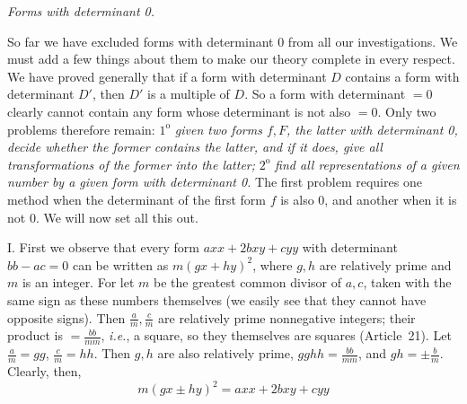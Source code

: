 \begin{center}
\textit{Forms with determinant 0.}
\end{center}

So far we have excluded forms with determinant 0 from all our investigations. We must add a few things about them to make our theory complete in every respect. We have proved generally that if a form with determinant $D$ contains a form with determinant $D'$, then $D'$ is a multiple of $D$. So a form with determinant $=0$ clearly cannot contain any form whose determinant is not also $=0$. Only two problems therefore remain: $1^{\mathrm{o}}$ \textit{given two forms $f,F$, the latter with determinant 0, decide whether the former contains the latter, and if it does, give all transformations of the former into the latter;} $2^{\mathrm{o}}$ \textit{find all representations of a given number by a given form with determinant 0.} The first problem requires one
method when the determinant of the first form $f$ is also 0, and another when it is not 0. We will now set all this out.

I. First we observe that every form $axx+2bxy+cyy$ with determinant $bb-ac=0$ can be written as $m(gx+hy)^2$, where $g,h$ are relatively prime and $m$ is an integer. For let $m$ be the greatest common divisor of $a,c$, taken with the same sign as these numbers themselves (we easily see that they cannot have opposite signs). Then $\frac{a}{m},\frac{c}{m}$ are relatively prime nonnegative integers; their product is $=\frac{bb}{mm}$, \textit{i.e.}, a square, so they themselves are squares (Article~21). Let $\frac{a}{m}=gg$, $\frac{c}{m}=hh$. Then $g,h$ are also relatively prime, $gghh=\frac{bb}{mm}$, and $gh=\pm\frac{b}{m}$. Clearly, then,
\[
m(gx\pm hy)^2=axx+2bxy+cyy
\]

